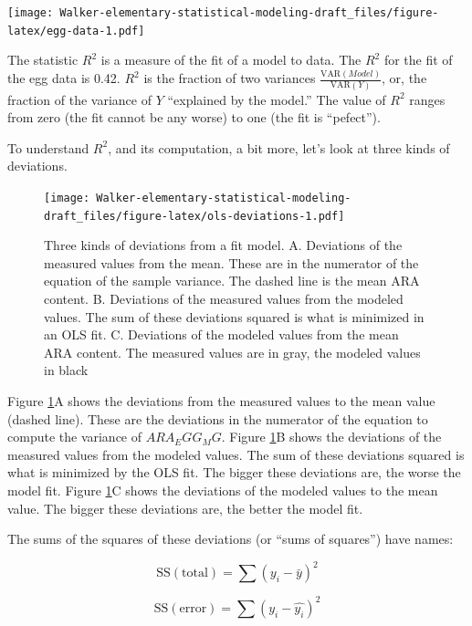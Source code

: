 \documentclass[]{book}
\theoremstyle{definition}
\theoremstyle{definition}
\theoremstyle{definition}
\theoremstyle{remark}
\begin{document}
\texttt{[image: Walker-elementary-statistical-modeling-draft\_files/figure-latex/egg-data-1.pdf]}

The statistic \(R^2\) is a measure of the fit of a model to data. The
\(R^2\) for the fit of the egg data is 0.42. \(R^2\) is the fraction of
two variances \(\frac{\mathrm{VAR}(Model)}{\mathrm{VAR}(Y)}\), or, the
fraction of the variance of \(Y\) ``explained by the model.'' The value
of \(R^2\) ranges from zero (the fit cannot be any worse) to one (the
fit is ``pefect'').

To understand \(R^2\), and its computation, a bit more, let's look at
three kinds of deviations.

\begin{figure}
\centering
\texttt{[image: Walker-elementary-statistical-modeling-draft\_files/figure-latex/ols-deviations-1.pdf]}
\caption{\label{fig:ols-deviations}Three kinds of deviations from a fit
model. A. Deviations of the measured values from the mean. These are in
the numerator of the equation of the sample variance. The dashed line is
the mean ARA content. B. Deviations of the measured values from the
modeled values. The sum of these deviations squared is what is minimized
in an OLS fit. C. Deviations of the modeled values from the mean ARA
content. The measured values are in gray, the modeled values in black}
\end{figure}

Figure \ref{fig:ols-deviations}A shows the deviations from the measured
values to the mean value (dashed line). These are the deviations in the
numerator of the equation to compute the variance of \(ARA_EGG_MG\).
Figure \ref{fig:ols-deviations}B shows the deviations of the measured
values from the modeled values. The sum of these deviations squared is
what is minimized by the OLS fit. The bigger these deviations are, the
worse the model fit. Figure \ref{fig:ols-deviations}C shows the
deviations of the modeled values to the mean value. The bigger these
deviations are, the better the model fit.

The sums of the squares of these deviations (or ``sums of squares'')
have names:

\begin{equation}
\mathrm{SS(total)} = \sum{(y_i - \bar{y})^2}
\end{equation}

\begin{equation}
\mathrm{SS(error)} = \sum{(y_i - \hat{y_i})^2}
\end{equation}
\end{document}
